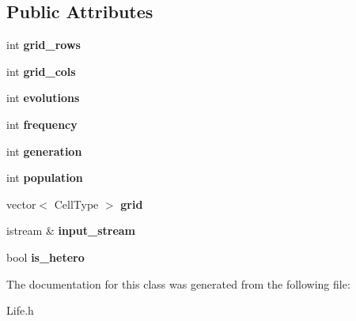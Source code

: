 \subsection*{Public Attributes}
\begin{DoxyCompactItemize}
\item 
\hypertarget{classLife_a5e249348368f58125728bf6f1888ab0c}{int {\bfseries grid\-\_\-rows}}\label{classLife_a5e249348368f58125728bf6f1888ab0c}

\item 
\hypertarget{classLife_aaf218714ee6df928b2273350a499136c}{int {\bfseries grid\-\_\-cols}}\label{classLife_aaf218714ee6df928b2273350a499136c}

\item 
\hypertarget{classLife_a2d286b3c1129abc0587a0b85391e1fb3}{int {\bfseries evolutions}}\label{classLife_a2d286b3c1129abc0587a0b85391e1fb3}

\item 
\hypertarget{classLife_a84708bb3de8658b0aa2d2749b7017c66}{int {\bfseries frequency}}\label{classLife_a84708bb3de8658b0aa2d2749b7017c66}

\item 
\hypertarget{classLife_a43ab920e05039c94378ddee6f54b85e9}{int {\bfseries generation}}\label{classLife_a43ab920e05039c94378ddee6f54b85e9}

\item 
\hypertarget{classLife_a58260f9a901a41f1318b9a1dac4f66fe}{int {\bfseries population}}\label{classLife_a58260f9a901a41f1318b9a1dac4f66fe}

\item 
\hypertarget{classLife_a830fc290bc14345376fb66649968e111}{vector$<$ Cell\-Type $>$ {\bfseries grid}}\label{classLife_a830fc290bc14345376fb66649968e111}

\item 
\hypertarget{classLife_a9844b0b9fcb2405b9d8914a954e87d61}{istream \& {\bfseries input\-\_\-stream}}\label{classLife_a9844b0b9fcb2405b9d8914a954e87d61}

\item 
\hypertarget{classLife_a82ac9f74b82e51e6a31ea25b5110c863}{bool {\bfseries is\-\_\-hetero}}\label{classLife_a82ac9f74b82e51e6a31ea25b5110c863}

\end{DoxyCompactItemize}


The documentation for this class was generated from the following file\-:\begin{DoxyCompactItemize}
\item 
Life.\-h\end{DoxyCompactItemize}
